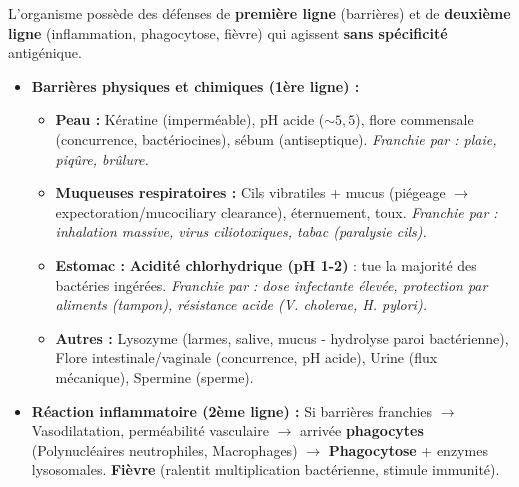 \documentclass[11pt]{article}
\begin{document}
\begin{propriete}
    L'organisme possède des défenses de \textbf{première ligne} (barrières) et de \textbf{deuxième ligne} (inflammation, phagocytose, fièvre) qui agissent \textbf{sans spécificité} antigénique.
    \begin{itemize}
        \item \textbf{Barrières physiques et chimiques (1ère ligne) :}
              \begin{itemize}
                  \item \textbf{Peau :} Kératine (imperméable), pH acide ($\sim 5,5$), flore commensale (concurrence, bactériocines), sébum (antiseptique). \textit{Franchie par : plaie, piqûre, brûlure.}
                  \item \textbf{Muqueuses respiratoires :} Cils vibratiles + mucus (piégeage $\rightarrow$ expectoration/mucociliary clearance), éternuement, toux. \textit{Franchie par : inhalation massive, virus ciliotoxiques, tabac (paralysie cils).}
                  \item \textbf{Estomac :} \textbf{Acidité chlorhydrique (pH 1-2)} : tue la majorité des bactéries ingérées. \textit{Franchie par : dose infectante élevée, protection par aliments (tampon), résistance acide (V. cholerae, H. pylori).}
                  \item \textbf{Autres :} Lysozyme (larmes, salive, mucus - hydrolyse paroi bactérienne), Flore intestinale/vaginale (concurrence, pH acide), Urine (flux mécanique), Spermine (sperme).
              \end{itemize}
        \item \textbf{Réaction inflammatoire (2ème ligne) :} Si barrières franchies $\rightarrow$ Vasodilatation, perméabilité vasculaire $\rightarrow$ arrivée \textbf{phagocytes} (Polynucléaires neutrophiles, Macrophages) $\rightarrow$ \textbf{Phagocytose} + enzymes lysosomales. \textbf{Fièvre} (ralentit multiplication bactérienne, stimule immunité).
    \end{itemize}
\end{propriete}
\end{document}
